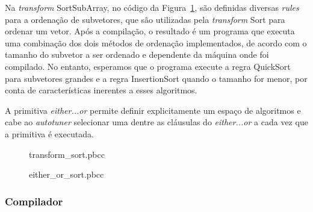 \documentclass[a4paper, 12pt]{article}
\begin{document}
Na \emph{transform} SortSubArray, no código da Figura~\ref{fig:sortpbcc}, são 
definidas diversas \emph{rules} para a ordenação de subvetores, que
são utilizadas pela \emph{transform} Sort para ordenar um vetor. Após a
compilação, o resultado é um programa que executa uma combinação dos dois
métodos de ordenação implementados, de acordo com o tamanho do subvetor a
ser ordenado e dependente da máquina onde foi compilado. No entanto, esperamos
que o programa execute a regra QuickSort para subvetores grandes e a 
regra InsertionSort quando o tamanho for menor, por conta de características
inerentes a esses algoritmos.

A primitiva \emph{either...or} permite definir explicitamente um espaço
de algoritmos e cabe ao \emph{autotuner} selecionar uma dentre as cláusulas
do \emph{either...or} a cada vez que a primitiva é executada.

\begin{figure}[H]
    \centering
    
    \caption{transform\_sort.pbcc}
    \label{fig:sortpbcc}
\end{figure}

\begin{figure}[H]
    \centering
    
    \caption{either\_or\_sort.pbcc}
    \label{fig:sort2pbcc}
\end{figure}

\subsubsection{Compilador}
\end{document}
